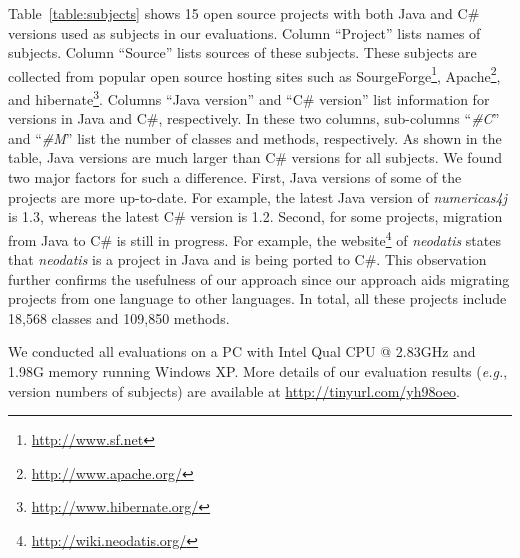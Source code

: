 Table~\ref{table:subjects} shows 15 open source projects with both Java and
C\# versions used as subjects in our evaluations.
Column ``Project'' lists names of subjects. Column ``Source'' lists sources of these
subjects. These subjects are collected from popular open source hosting sites such
as SourgeForge\footnote{\url{http://www.sf.net}},
Apache\footnote{\url{http://www.apache.org/}}, and
hibernate\footnote{\url{http://www.hibernate.org/}}. Columns ``Java
version'' and ``C\# version'' list information for versions in Java and
C\#, respectively. In these two columns, sub-columns
``\emph{\#C}'' and ``\emph{\#M}'' list the number of classes and methods, respectively. As shown
in the table, Java versions are much larger than C\# versions
for all subjects. We found two major factors for such
a difference. First, Java versions of some of the
projects are more up-to-date. For example, the latest Java
version of \emph{numericas4j} is 1.3, whereas the latest C\# version
is 1.2. Second, for some projects, migration from Java to C\# is still in
progress. For example, the
website\footnote{\url{http://wiki.neodatis.org/}} of \emph{neodatis}
states that \emph{neodatis} is a project in Java and is being ported
to C\#. This observation further confirms the usefulness of our
approach since our approach aids migrating projects from one language to other
languages. In total, all these projects include 18,568 classes and 109,850
methods.

We conducted all evaluations on a PC with Intel Qual CPU @
2.83GHz and 1.98G memory running Windows XP. More details of our
evaluation results (\emph{e.g.}, version numbers of subjects) are available at \url{http://tinyurl.com/yh98oeo}.

